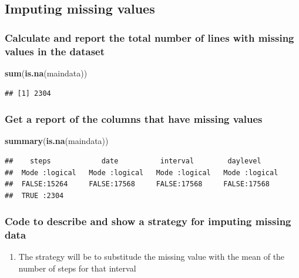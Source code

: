 \documentclass[]{article}
\newenvironment{Shaded}{\begin{snugshade}}{\end{snugshade}}
\newcommand{\KeywordTok}[1]{\textcolor[rgb]{0.13,0.29,0.53}{\textbf{#1}}}
\newcommand{\NormalTok}[1]{#1}
\providecommand{\tightlist}{%
  \setlength{\itemsep}{0pt}\setlength{\parskip}{0pt}}
\begin{document}
\subsection{Imputing missing values}\label{imputing-missing-values}

\subsubsection{Calculate and report the total number of lines with
missing values in the
dataset}\label{calculate-and-report-the-total-number-of-lines-with-missing-values-in-the-dataset}

\begin{Shaded}
\begin{Highlighting}[]
\KeywordTok{sum}\NormalTok{(}\KeywordTok{is.na}\NormalTok{(maindata))}
\end{Highlighting}
\end{Shaded}

\begin{verbatim}
## [1] 2304
\end{verbatim}

\subsubsection{Get a report of the columns that have missing
values}\label{get-a-report-of-the-columns-that-have-missing-values}

\begin{Shaded}
\begin{Highlighting}[]
\KeywordTok{summary}\NormalTok{(}\KeywordTok{is.na}\NormalTok{(maindata))}
\end{Highlighting}
\end{Shaded}

\begin{verbatim}
##    steps            date          interval        daylevel      
##  Mode :logical   Mode :logical   Mode :logical   Mode :logical  
##  FALSE:15264     FALSE:17568     FALSE:17568     FALSE:17568    
##  TRUE :2304
\end{verbatim}

\subsubsection{Code to describe and show a strategy for imputing missing
data}\label{code-to-describe-and-show-a-strategy-for-imputing-missing-data}

\begin{enumerate}
\def\labelenumi{\arabic{enumi}.}
\tightlist
\item
  The strategy will be to substitude the missing value with the mean of
  the number of steps for that interval
\end{enumerate}
\end{document}
